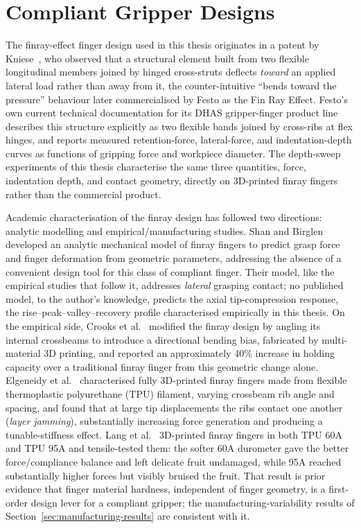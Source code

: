 \section{Compliant Gripper Designs}

The finray-effect finger design used in this thesis originates in a patent
by Kniese~\cite{kniese2000loadcarrying}, who observed that a structural
element built from two flexible longitudinal members joined by hinged
cross-struts deflects \emph{toward} an applied lateral load rather than
away from it, the counter-intuitive ``bends toward the pressure''
behaviour later commercialised by Festo as the Fin Ray Effect\textregistered.
Festo's own current technical documentation for its
DHAS gripper-finger product line~\cite{festo2018dhas} describes this
structure explicitly as two flexible bands joined by cross-ribs at flex
hinges, and reports measured retention-force, lateral-force, and
indentation-depth curves as functions of gripping force and workpiece
diameter. The depth-sweep experiments of this thesis characterise the same three
quantities, force, indentation depth, and contact geometry, directly
on 3D-printed finray fingers rather than the commercial product.

Academic characterisation of the finray design has followed two
directions: analytic modelling and empirical/manufacturing studies. Shan
and Birglen~\cite{shan2020modeling} developed an analytic mechanical model
of finray fingers to predict grasp force and finger deformation from
geometric parameters, addressing the absence of a convenient design tool
for this class of compliant finger. Their model, like the empirical
studies that follow it, addresses \emph{lateral} grasping contact; no
published model, to the author's knowledge, predicts the axial
tip-compression response, the rise--peak--valley--recovery profile
characterised empirically in this thesis. On the empirical side, Crooks et
al.~\cite{crooks2016finray} modified the finray design by angling its
internal crossbeams to introduce a directional bending bias, fabricated by
multi-material 3D printing, and reported an approximately 40\% increase in
holding capacity over a traditional finray finger from this geometric
change alone. Elgeneidy et al.~\cite{elgeneidy2019characterising}
characterised fully 3D-printed finray fingers made from flexible
thermoplastic polyurethane (TPU) filament, varying crossbeam rib angle and
spacing, and found that at large tip displacements the ribs contact one
another (\emph{layer jamming}), substantially increasing force generation
and producing a tunable-stiffness effect. Lang et
al.~\cite{lang2025softrobotics} 3D-printed finray fingers in both TPU 60A
and TPU 95A and tensile-tested them: the softer 60A durometer gave the
better force/compliance balance and left delicate fruit undamaged, while
95A reached substantially higher forces but visibly bruised the fruit.
That result is prior evidence that finger material hardness, independent
of finger geometry, is a first-order design lever for a compliant
gripper; the manufacturing-variability results of
Section~\ref{sec:manufacturing-results} are consistent with it.

